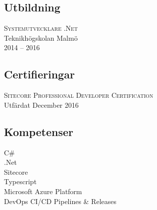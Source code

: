 \documentclass[usenames,dvipsnames]{article}
\begin{document}
\begin{minipage}[t]{0.4\textwidth}
\begin{flushleft}
\subsection*{\textcolor{NavyBlue}{Utbildning}}
\textsc{Systemutvecklare .Net}\\
Teknikhögskolan Malmö\\
2014 -- 2016

\subsection*{\textcolor{NavyBlue}{Certifieringar}}
\textsc{Sitecore Professional Developer Certification}\\
Utfärdat December 2016

\subsection*{\textcolor{NavyBlue}{Kompetenser}}
C\#\\
.Net\\
Sitecore\\
Typescript\\
Microsoft Azure Platform\\
DevOps CI/CD Pipelines \& Releases
\end{flushleft}
\end{minipage}
\end{document}
